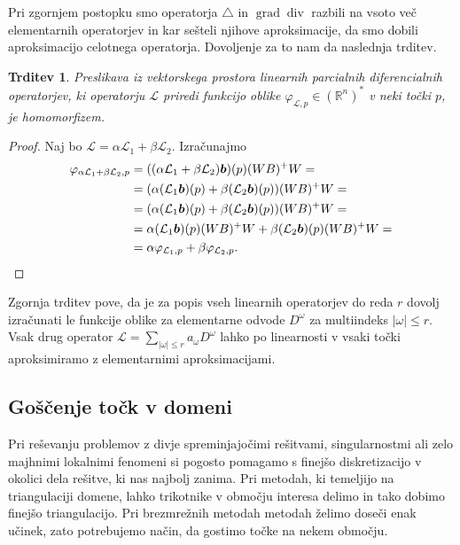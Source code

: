 \documentclass[12pt,a4paper,twoside]{article}
\theoremstyle{definition} %
\theoremstyle{plain} %
\newtheorem{trditev}[definicija]{Trditev}
\numberwithin{equation}{section}
\newcommand{\R}{\mathbb R}
\renewcommand{\L}{\mathcal{L}}
\newcommand{\lap}{\triangle}
\renewcommand{\div}{\operatorname{div}}
\newcommand{\grad}{\operatorname{grad}}
\renewcommand{\b}{\boldsymbol}
\renewcommand{\phi}{\varphi}
\begin{document}
Pri zgornjem postopku smo operatorja $\lap$ in $\grad \div$ razbili na vsoto več elementarnih
operatorjev in kar sešteli njihove aproksimacije, da smo dobili aproksimacijo celotnega operatorja.
Dovoljenje za to nam da naslednja trditev.

\begin{trditev}
  Preslikava iz vektorskega prostora linearnih parcialnih diferencialnih operatorjev, ki operatorju
  $\L$ priredi funkcijo oblike $\phi_{\L,p} \in (\R^n)^\ast$ v neki točki $p$, je homomorfizem.
\end{trditev}
\begin{proof}
Naj bo $\L = \alpha \L_1 + \beta \L_2$. Izračunajmo
  \begin{align*}
    \phi_{\alpha \L_1 + \beta \L_2,p} &=
    ((\alpha \L_1 + \beta \L_2)\b b)(p)(WB)^+W = \\
    &= (\alpha (\L_1\b b)(p) + \beta (\L_2\b b)(p))(WB)^+W = \\
    &= (\alpha (\L_1\b b)(p) + \beta (\L_2\b b)(p))(WB)^+W =\\
  &= \alpha (\L_1\b b)(p)(WB)^+W + \beta (\L_2\b b)(p)(WB)^+W = \\
  &= \alpha \phi_{\L_1,p} + \beta \phi_{\L_2,p}. \qedhere
  \end{align*}
\end{proof}
Zgornja trditev pove, da je za popis vseh linearnih operatorjev do reda $r$ dovolj
izračunati le funkcije oblike za elementarne odvode $D^\omega$ za multiindeks $|\omega| \leq r$.
Vsak drug operator $\L = \sum_{|\omega| \leq r} a_\omega D^\omega$ lahko po linearnosti
v vsaki točki aproksimiramo z elementarnimi aproksimacijami.

\subsection{Goščenje točk v domeni}
Pri reševanju problemov z divje spreminjajočimi rešitvami, singularnostmi ali zelo majhnimi
lokalnimi fenomeni si pogosto pomagamo s finejšo diskretizacijo v okolici dela rešitve, ki nas
najbolj zanima. Pri metodah, ki temeljijo na triangulaciji domene, lahko trikotnike v območju
interesa delimo in tako dobimo finejšo triangulacijo. Pri brezmrežnih metodah metodah želimo doseči
enak učinek, zato potrebujemo način, da gostimo točke na nekem območju.
\end{document}
